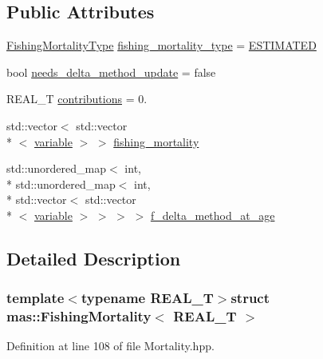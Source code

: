 \subsection*{Public Attributes}
\begin{DoxyCompactItemize}
\item 
\hyperlink{namespacemas_aacd7136161d1e9de202129d69640a575}{Fishing\-Mortality\-Type} \hyperlink{structmas_1_1_fishing_mortality_aba52dc6a63a8c8bc895b946cba5a5309}{fishing\-\_\-mortality\-\_\-type} = \hyperlink{namespacemas_aacd7136161d1e9de202129d69640a575acd5f3e01a8588334bf98023c12ea8169}{E\-S\-T\-I\-M\-A\-T\-E\-D}
\item 
bool \hyperlink{structmas_1_1_fishing_mortality_aa5e8bbb289155d313e98aa8349dfdf2c}{needs\-\_\-delta\-\_\-method\-\_\-update} = false
\item 
R\-E\-A\-L\-\_\-\-T \hyperlink{structmas_1_1_fishing_mortality_ac9621f8a36e68bd04ff91a0896c4b09d}{contributions} = 0.
\item 
std\-::vector$<$ std\-::vector\\*
$<$ \hyperlink{structmas_1_1_fishing_mortality_ad7a9ae18fb1cbfe1bf7c2fa0b3e1ee73}{variable} $>$ $>$ \hyperlink{structmas_1_1_fishing_mortality_a8762786de78be37776c371f1a4f46fcc}{fishing\-\_\-mortality}
\item 
std\-::unordered\-\_\-map$<$ int, \\*
std\-::unordered\-\_\-map$<$ int, \\*
std\-::vector$<$ std\-::vector\\*
$<$ \hyperlink{structmas_1_1_fishing_mortality_ad7a9ae18fb1cbfe1bf7c2fa0b3e1ee73}{variable} $>$ $>$ $>$ $>$ \hyperlink{structmas_1_1_fishing_mortality_ad92f2a24fd5a5f26a00ad98a9276af27}{f\-\_\-delta\-\_\-method\-\_\-at\-\_\-age}
\end{DoxyCompactItemize}


\subsection{Detailed Description}
\subsubsection*{template$<$typename R\-E\-A\-L\-\_\-\-T$>$struct mas\-::\-Fishing\-Mortality$<$ R\-E\-A\-L\-\_\-\-T $>$}



Definition at line 108 of file Mortality.\-hpp.



